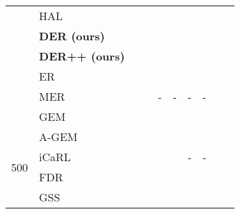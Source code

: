 \documentclass{article}
\begin{document}
\begin{table}[H]
{{\begin{tabular}{clcccccccc}
                        & HAL                   &   \tiny{}                            &   \tiny{}                         & \tiny{}                       & \tiny{}                         & \tiny{}                      & \tiny{} \\
                        & \textbf{DER (ours)}   &   \tiny{}                            &   \tiny{}                         & \tiny{}                       &  \tiny{}                         & \tiny{}                      &  \tiny{} \\
                        & \textbf{DER++ (ours)} &   \tiny{}                            &   \tiny{}                         & \tiny{}                       &  \tiny{}                         & \tiny{}&  \tiny{} \\
\midrule                                                                                    
                        & ER                    &   \tiny{}                            &   \tiny{}                         & \tiny{}                       &  \tiny{}                         & \tiny{}                      &  \tiny{} \\
                        & MER                   &   \tiny{}                            &   \tiny{}                         & -                                              & -                                                & -                                             & -                       \\
                        & GEM                   &   \tiny{}                            &   \tiny{}                         & \tiny{}                       &  \tiny{}                         & \tiny{}                      &  \tiny{} \\
                        & A-GEM                 &  \tiny{}                             &   \tiny{}                         & \tiny{}                       & \tiny{}                         & \tiny{}                      & \tiny{} \\
\multirow{2}{*}{500}    & iCaRL                 &   \tiny{}                            &  \tiny{}& \tiny{}                      &  \tiny{}& -                                             & -                        \\
                        & FDR                   &   \tiny{}                            &   \tiny{}                         & \tiny{}                       &  \tiny{}                         & \tiny{}                      &  \tiny{} \\
                        & GSS                   &   \tiny{}                            &   \tiny{}                         & \tiny{}                       &  \tiny{}                         & \tiny{}                      & \tiny{} \\

\end{tabular}}}
\end{table}
\end{document}
